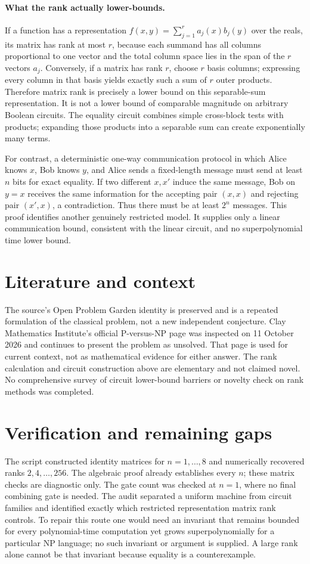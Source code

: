 \documentclass[11pt,a4paper]{article}
\begin{document}
\paragraph{What the rank actually lower-bounds.}
If a function has a representation $f(x,y)=\sum_{j=1}^r a_j(x)b_j(y)$ over the reals, its matrix has rank at most $r$, because each summand has all columns proportional to one vector and the total column space lies in the span of the $r$ vectors $a_j$. Conversely, if a matrix has rank $r$, choose $r$ basis columns; expressing every column in that basis yields exactly such a sum of $r$ outer products. Therefore matrix rank is precisely a lower bound on this separable-sum representation. It is not a lower bound of comparable magnitude on arbitrary Boolean circuits. The equality circuit combines simple cross-block tests with products; expanding those products into a separable sum can create exponentially many terms.

For contrast, a deterministic one-way communication protocol in which Alice knows $x$, Bob knows $y$, and Alice sends a fixed-length message must send at least $n$ bits for exact equality. If two different $x,x'$ induce the same message, Bob on $y=x$ receives the same information for the accepting pair $(x,x)$ and rejecting pair $(x',x)$, a contradiction. Thus there must be at least $2^n$ messages. This proof identifies another genuinely restricted model. It supplies only a linear communication bound, consistent with the linear circuit, and no superpolynomial time lower bound.

\section{Literature and context}
The source's Open Problem Garden identity is preserved and is a repeated formulation of the classical problem, not a new independent conjecture. Clay Mathematics Institute's official P-versus-NP page was inspected on 11 October 2026 and continues to present the problem as unsolved. That page is used for current context, not as mathematical evidence for either answer. The rank calculation and circuit construction above are elementary and not claimed novel. No comprehensive survey of circuit lower-bound barriers or novelty check on rank methods was completed.

\section{Verification and remaining gaps}
The script constructed identity matrices for $n=1,\ldots,8$ and numerically recovered ranks $2,4,\ldots,256$. The algebraic proof already establishes every $n$; these matrix checks are diagnostic only. The gate count was checked at $n=1$, where no final combining gate is needed. The audit separated a uniform machine from circuit families and identified exactly which restricted representation matrix rank controls. To repair this route one would need an invariant that remains bounded for every polynomial-time computation yet grows superpolynomially for a particular NP language; no such invariant or argument is supplied. A large rank alone cannot be that invariant because equality is a counterexample.
\end{document}
